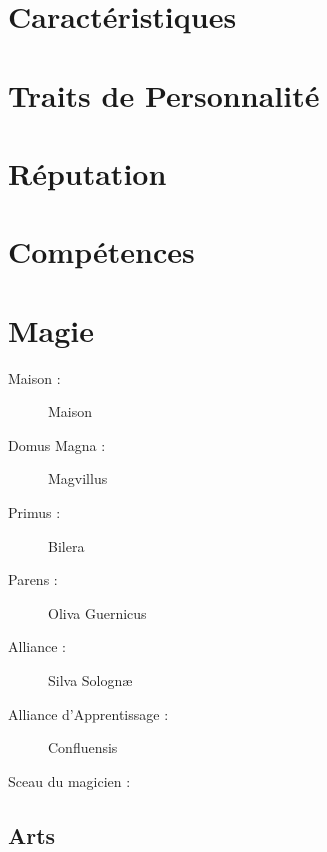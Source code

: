 \section*{Caractéristiques}


\caractableMP

\begin{multicols*}{2}

\longVFQs

\section*{Traits de Personnalité}

\traitslong

\section*{Réputation}

\reputationslong



\section*{Compétences}

\abilitieslong

\end{multicols*}

\pagebreak

\section*{Magie}
\begin{multicols}{2}
\begin{description}
\item[Maison :] Maison
\item[Domus Magna :] Magvillus
\item[Primus :] Bilera
\item[Parens :] Oliva Guernicus
\item[Alliance :] Silva Solognæ
\item[Alliance d'Apprentissage :] Confluensis
\item[Sceau du magicien :] \magussigil
\end{description}
\end{multicols}
\subsection*{Arts}

